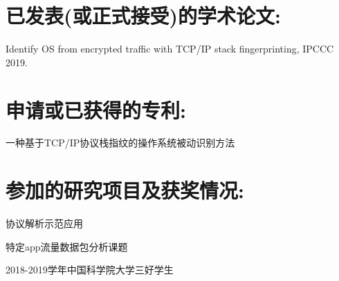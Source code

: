 \section*{已发表(或正式接受)的学术论文:}

Identify OS from encrypted traffic with TCP/IP stack fingerprinting, IPCCC 2019.

\section*{申请或已获得的专利:}

一种基于TCP/IP协议栈指纹的操作系统被动识别方法

\section*{参加的研究项目及获奖情况:}

协议解析示范应用

特定app流量数据包分析课题

2018-2019学年中国科学院大学三好学生

